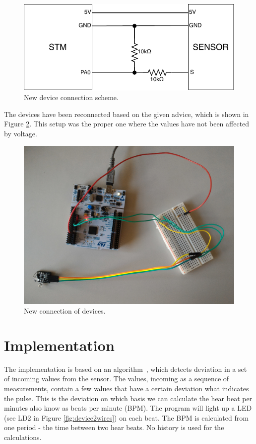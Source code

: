 \documentclass[11pt,a4paper]{article}
\begin{document}
\begin{figure}[H]
    \centering
    \includegraphics[scale=1.4]{img/new_con_scheme.pdf}
    \caption{New device connection scheme.}
    \label{fig:new_con_scheme}
\end{figure}

The devices have been reconnected based on the given advice, which is shown in Figure \ref{fig:new_dev_con}. This setup was the proper one where the values have not been affected by voltage.

\begin{figure}[H]
    \centering
    \includegraphics[scale=0.1]{img/setup2.jpg}
    \caption{New connection of devices.}
    \label{fig:new_dev_con}
\end{figure}

\newpage

\section{Implementation}\label{sec:impl}

The implementation is based on an algorithm~\cite{SENSOR}, which detects deviation in a set of incoming values from the sensor. The values, incoming as a sequence of measurements, contain a few values that have a certain deviation what indicates the pulse. This is the deviation on which basis we can calculate the hear beat per minutes also know as beats per minute (BPM). The program will light up a LED (see LD2 in Figure \ref{fig:device2wires}) on each beat. The BPM is calculated from one period - the time between two hear beats. No history is used for the calculations.\\
\end{document}
